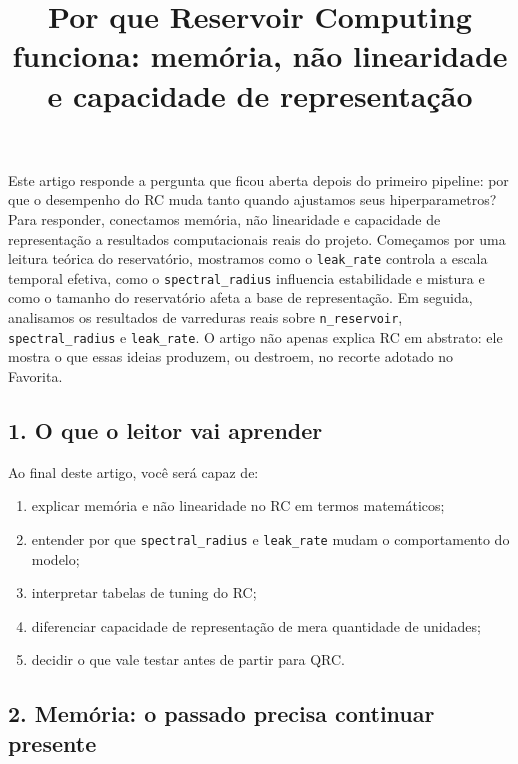 \documentclass[12pt]{article}
\title{Por que Reservoir Computing funciona: memória, não linearidade e capacidade de representação}
\author{}
\providecommand{\tightlist}{%
  \setlength{\itemsep}{0pt}\setlength{\parskip}{0pt}}
\begin{document}
\maketitle

\begin{resumo}
Este artigo responde a pergunta que ficou aberta depois do primeiro pipeline: por que o desempenho do RC muda tanto quando ajustamos seus hiperparametros? Para responder, conectamos memória, não linearidade e capacidade de representação a resultados computacionais reais do projeto. Começamos por uma leitura teórica do reservatório, mostramos como o \texttt{leak\_rate} controla a escala temporal efetiva, como o \texttt{spectral\_radius} influencia estabilidade e mistura e como o tamanho do reservatório afeta a base de representação. Em seguida, analisamos os resultados de varreduras reais sobre \texttt{n\_reservoir}, \texttt{spectral\_radius} e \texttt{leak\_rate}. O artigo não apenas explica RC em abstrato: ele mostra o que essas ideias produzem, ou destroem, no recorte adotado no Favorita.
\end{resumo}

\subsection{1. O que o leitor vai aprender}\label{1-o-que-o-leitor-vai-aprender}

Ao final deste artigo, você será capaz de:

\begin{enumerate}
\def\labelenumi{\arabic{enumi}.}
\tightlist
\item
  explicar memória e não linearidade no RC em termos matemáticos;
\item
  entender por que \texttt{spectral\_radius} e \texttt{leak\_rate} mudam o comportamento do modelo;
\item
  interpretar tabelas de tuning do RC;
\item
  diferenciar capacidade de representação de mera quantidade de unidades;
\item
  decidir o que vale testar antes de partir para QRC.
\end{enumerate}

\subsection{2. Memória: o passado precisa continuar presente}\label{2-memuxf3ria-o-passado-precisa-continuar-presente}
\end{document}
